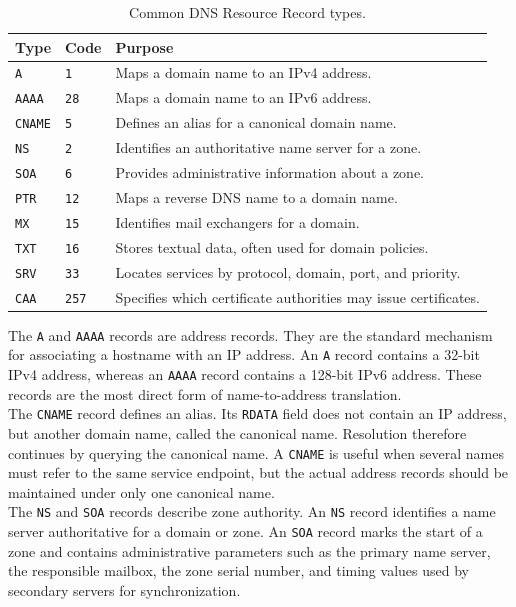 \documentclass{scrbook}
\begin{document}
	\begin{table}[!h]
		\centering
		\begin{tabular}{lll}
			\hline
			\textbf{Type} & \textbf{Code} & \textbf{Purpose} \\
			\hline
			\texttt{A} & \texttt{1} & Maps a domain name to an IPv4 address. \\
			\texttt{AAAA} & \texttt{28} & Maps a domain name to an IPv6 address. \\
			\texttt{CNAME} & \texttt{5} & Defines an alias for a canonical domain name. \\
			\texttt{NS} & \texttt{2} & Identifies an authoritative name server for a zone. \\
			\texttt{SOA} & \texttt{6} & Provides administrative information about a zone. \\
			\texttt{PTR} & \texttt{12} & Maps a reverse DNS name to a domain name. \\
			\texttt{MX} & \texttt{15} & Identifies mail exchangers for a domain. \\
			\texttt{TXT} & \texttt{16} & Stores textual data, often used for domain policies. \\
			\texttt{SRV} & \texttt{33} & Locates services by protocol, domain, port, and priority. \\
			\texttt{CAA} & \texttt{257} & Specifies which certificate authorities may issue certificates. \\
			\hline
		\end{tabular}
		\caption{Common DNS Resource Record types.}
	\end{table}
	
	The \texttt{A} and \texttt{AAAA} records are address records. They are the standard mechanism for associating a hostname with an IP address. An \texttt{A} record contains a 32-bit IPv4 address, whereas an \texttt{AAAA} record contains a 128-bit IPv6 address. These records are the most direct form of name-to-address translation.\\
	
	The \texttt{CNAME} record defines an alias. Its \texttt{RDATA} field does not contain an IP address, but another domain name, called the canonical name. Resolution therefore continues by querying the canonical name. A \texttt{CNAME} is useful when several names must refer to the same service endpoint, but the actual address records should be maintained under only one canonical name.\\
	
	The \texttt{NS} and \texttt{SOA} records describe zone authority. An \texttt{NS} record identifies a name server authoritative for a domain or zone. An \texttt{SOA} record marks the start of a zone and contains administrative parameters such as the primary name server, the responsible mailbox, the zone serial number, and timing values used by secondary servers for synchronization.\\
	
\end{document}
